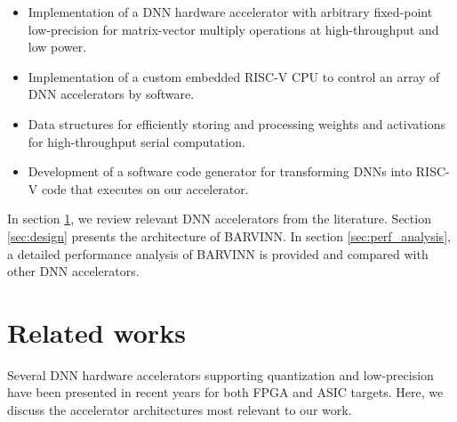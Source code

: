 \documentclass[sigconf]{acmart}
\newcommand{\BARVINN}{BARVINN}
\begin{document}
\begin{itemize}
    \item Implementation of a DNN hardware accelerator with arbitrary fixed-point low-precision for matrix-vector multiply operations at high-throughput and low power.
    \item Implementation of a custom embedded RISC-V CPU to control an array of DNN accelerators by software.
    \item Data structures for efficiently storing and processing weights and activations for high-throughput serial computation.
    \item Development of a software code generator for transforming DNNs into RISC-V code that executes on our accelerator.


\end{itemize}


In section \ref{sec:related_works}, we review relevant DNN  accelerators from the literature. Section \ref{sec:design} presents the architecture of \BARVINN{}. In section \ref{sec:perf_analysis}, a detailed performance analysis of \BARVINN{} is provided and compared with other DNN accelerators. 

\section{Related works}
\label{sec:related_works}

Several DNN hardware accelerators supporting quantization and low-precision have been presented in recent years for both FPGA and ASIC targets. Here, we discuss the accelerator architectures most relevant to our work.
\end{document}
